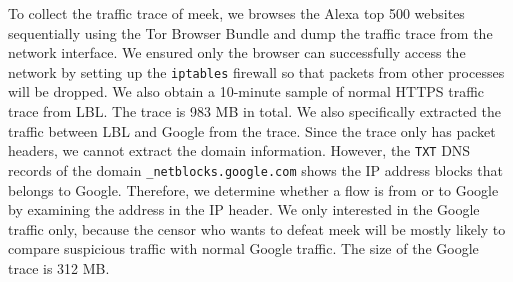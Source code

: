 \documentclass{article}
\begin{document}
To collect the traffic trace of meek, we browses the Alexa top 500 websites sequentially using 
the Tor Browser Bundle and dump the traffic trace from the network interface. We ensured only
the browser can successfully access the network by setting
up the \texttt{iptables} firewall so that packets from other processes will be dropped. We also 
obtain a 10-minute sample of normal HTTPS traffic trace from LBL. The trace is 983 MB in total. 
We also specifically extracted the traffic between LBL and Google from the trace. Since the trace 
only has packet headers, we cannot extract the domain information. However, the \texttt{TXT} DNS
records of the domain \texttt{\_netblocks.google.com} shows the IP address blocks that belongs to
Google. Therefore, we determine whether a flow is from or to Google by examining the address in the 
IP header. We only interested in the Google traffic only, because the censor who wants to defeat meek
will be mostly likely to compare suspicious traffic with normal Google traffic. The size of the 
Google trace is 312 MB. 
\end{document}
